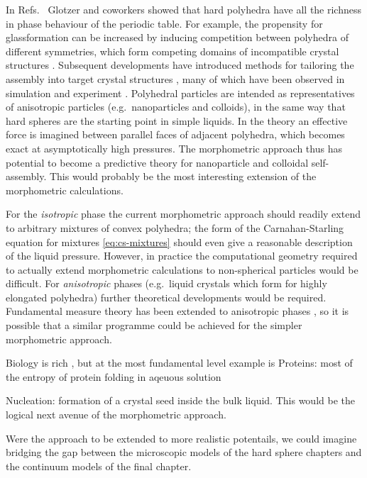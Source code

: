 \documentclass[11pt,twoside]{report}
\begin{document}
In Refs.\ \cite{DamascenoS2012,DamascenoAN2012} Glotzer and coworkers showed that hard polyhedra have all the richness in phase behaviour of the periodic table.
For example, the propensity for glassformation can be increased by inducing competition between polyhedra of different symmetries, which form competing domains of incompatible crystal structures \cite{TeichNC2019}.
Subsequent developments have introduced methods for tailoring the assembly into target crystal structures \cite{YoungACIE2013,SchultzAN2015,VanAndersAN2015}, many of which have been observed in simulation and experiment \cite{MisztaNM2011,HenzieNM2012,QiJCP2013}.
Polyhedral particles are intended as representatives of anisotropic particles (e.g.\ nanoparticles and colloids), in the same way that hard spheres are the starting point in simple liquids.
In the theory an effective force is imagined between parallel faces of adjacent polyhedra, which becomes exact at asymptotically high pressures.
The morphometric approach thus has potential to become a predictive theory for nanoparticle and colloidal self-assembly.
This would probably be the most interesting extension of the morphometric calculations.

For the \emph{isotropic} phase the current morphometric approach should readily extend to arbitrary mixtures of convex polyhedra; the form of the Carnahan-Starling equation for mixtures \eqref{eq:cs-mixtures} should even give a reasonable description of the liquid pressure.
However, in practice the computational geometry required to actually extend morphometric calculations to non-spherical particles would be difficult.
For \emph{anisotropic} phases (e.g.\ liquid crystals which form for highly elongated polyhedra) further theoretical developments would be required.
Fundamental measure theory has been extended to anisotropic phases \cite{Hansen-GoosPRL2009,Hansen-GoosJPCM2010,WittmannEL2015,WittmannPRE2015,WittmannJPCM2016}, so it is possible that a similar programme could be achieved for the simpler morphometric approach.

Biology is rich , but at the most fundamental level example is Proteins: most of the entropy of protein folding in aqeuous solution \cite{HaranoCPL2004,HaranoBJ2005,KinoshitaCES2006,HaranoCPL2006}


Nucleation: formation of a crystal seed inside the bulk liquid.
This would be the logical next avenue of the morphometric approach.

Were the approach to be extended to more realistic potentails, we could imagine bridging the gap between the microscopic models of the hard sphere chapters and the continuum models of the final chapter.
\end{document}
